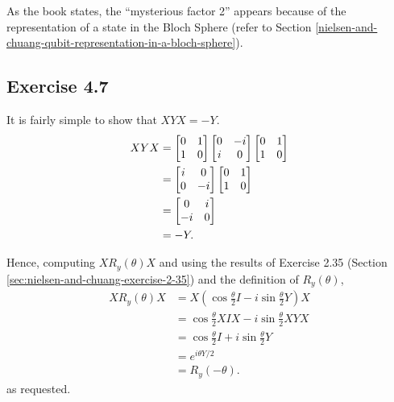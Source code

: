 As the book states,
the ``mysterious factor 2'' appears because of the
representation of a state in the Bloch Sphere
(refer to Section
\ref{nielsen-and-chuang-qubit-representation-in-a-bloch-sphere}).

\subsection{Exercise 4.7}
It is fairly simple to show that $XYX = -Y$.
\begin{align}
    XYX &= \left[\begin{matrix} 0 & 1 \\ 1 & 0 \end{matrix}\right] \left[\begin{matrix} 0 & -i \\ i & 0 \end{matrix}\right] \left[\begin{matrix} 0 & 1 \\ 1 & 0 \end{matrix}\right] \\
    &= \left[\begin{matrix} i & 0 \\ 0 & -i \end{matrix}\right] \left[\begin{matrix} 0 & 1 \\ 1 & 0 \end{matrix}\right] \\
    &= \left[\begin{matrix} 0 & i \\ -i & 0 \end{matrix}\right] \\
    &= -Y .
\end{align}

Hence, computing $X R_y(\theta) X$ and
using the results of Exercise 2.35 (Section \ref{sec:nielsen-and-chuang-exercise-2-35})
and the definition of $R_y(\theta)$,
\begin{align}
    X R_y(\theta) X &= X \left( \cos\frac{\theta}{2} I - i \sin\frac{\theta}{2} Y \right) X \\
    &= \cos\frac{\theta}{2} X I X - i \sin\frac{\theta}{2} X Y X \\
    &= \cos\frac{\theta}{2} I + i \sin\frac{\theta}{2} Y \\
    &= e^{i \theta Y / 2} \\
    &= R_y(-\theta) .
\end{align}
as requested.